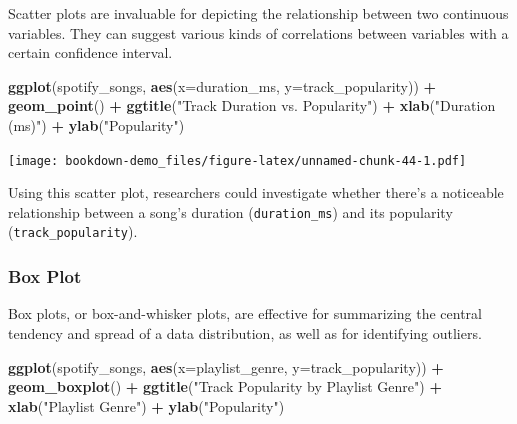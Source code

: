 \documentclass[
  b5paper]{book}
\newenvironment{Shaded}{\begin{snugshade}}{\end{snugshade}}
\newcommand{\AttributeTok}[1]{\textcolor[rgb]{0.13,0.29,0.53}{#1}}
\newcommand{\FunctionTok}[1]{\textcolor[rgb]{0.13,0.29,0.53}{\textbf{#1}}}
\newcommand{\NormalTok}[1]{#1}
\newcommand{\SpecialCharTok}[1]{\textcolor[rgb]{0.81,0.36,0.00}{\textbf{#1}}}
\newcommand{\StringTok}[1]{\textcolor[rgb]{0.31,0.60,0.02}{#1}}
\begin{document}
Scatter plots are invaluable for depicting the relationship between two continuous variables. They can suggest various kinds of correlations between variables with a certain confidence interval.

\begin{Shaded}
\begin{Highlighting}[]
  \FunctionTok{ggplot}\NormalTok{(spotify\_songs, }\FunctionTok{aes}\NormalTok{(}\AttributeTok{x=}\NormalTok{duration\_ms, }\AttributeTok{y=}\NormalTok{track\_popularity)) }\SpecialCharTok{+}
    \FunctionTok{geom\_point}\NormalTok{() }\SpecialCharTok{+}
    \FunctionTok{ggtitle}\NormalTok{(}\StringTok{"Track Duration vs. Popularity"}\NormalTok{) }\SpecialCharTok{+}
    \FunctionTok{xlab}\NormalTok{(}\StringTok{"Duration (ms)"}\NormalTok{) }\SpecialCharTok{+}
    \FunctionTok{ylab}\NormalTok{(}\StringTok{"Popularity"}\NormalTok{)}
\end{Highlighting}
\end{Shaded}

\texttt{[image: bookdown-demo\_files/figure-latex/unnamed-chunk-44-1.pdf]}

Using this scatter plot, researchers could investigate whether there's a noticeable relationship between a song's duration (\texttt{duration\_ms}) and its popularity (\texttt{track\_popularity}).

\hypertarget{box-plot}{%
\subsubsection{Box Plot}\label{box-plot}}

Box plots, or box-and-whisker plots, are effective for summarizing the central tendency and spread of a data distribution, as well as for identifying outliers.

\begin{Shaded}
\begin{Highlighting}[]
  \FunctionTok{ggplot}\NormalTok{(spotify\_songs, }\FunctionTok{aes}\NormalTok{(}\AttributeTok{x=}\NormalTok{playlist\_genre, }\AttributeTok{y=}\NormalTok{track\_popularity)) }\SpecialCharTok{+}
    \FunctionTok{geom\_boxplot}\NormalTok{() }\SpecialCharTok{+}
    \FunctionTok{ggtitle}\NormalTok{(}\StringTok{"Track Popularity by Playlist Genre"}\NormalTok{) }\SpecialCharTok{+}
    \FunctionTok{xlab}\NormalTok{(}\StringTok{"Playlist Genre"}\NormalTok{) }\SpecialCharTok{+}
    \FunctionTok{ylab}\NormalTok{(}\StringTok{"Popularity"}\NormalTok{)}
\end{Highlighting}
\end{Shaded}
\end{document}
